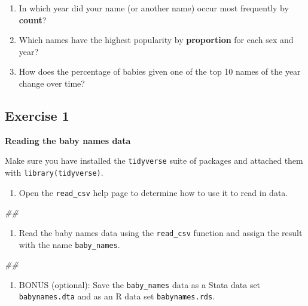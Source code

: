 \documentclass[]{book}
\newenvironment{Shaded}{\begin{snugshade}}{\end{snugshade}}
\newcommand{\CommentTok}[1]{\textcolor[rgb]{0.56,0.35,0.01}{\textit{#1}}}
\providecommand{\tightlist}{%
  \setlength{\itemsep}{0pt}\setlength{\parskip}{0pt}}
\begin{document}
\begin{enumerate}
\def\labelenumi{\arabic{enumi}.}
\tightlist
\item
  In which year did your name (or another name) occur most frequently by \textbf{count}?
\item
  Which names have the highest popularity by \textbf{proportion} for each sex and year?
\item
  How does the percentage of babies given one of the top 10 names of the year change over time?
\end{enumerate}

\hypertarget{exercise-1}{%
\subsection{Exercise 1}\label{exercise-1}}

\textbf{Reading the baby names data}

Make sure you have installed the \texttt{tidyverse} suite of packages and attached them with \texttt{library(tidyverse)}.

\begin{enumerate}
\def\labelenumi{\arabic{enumi}.}
\tightlist
\item
  Open the \texttt{read\_csv} help page to determine how to use it to read in data.
\end{enumerate}

\begin{Shaded}
\begin{Highlighting}[]
\CommentTok{##}
\end{Highlighting}
\end{Shaded}

\begin{enumerate}
\def\labelenumi{\arabic{enumi}.}
\setcounter{enumi}{1}
\tightlist
\item
  Read the baby names data using the \texttt{read\_csv} function and assign the result
  with the name \texttt{baby\_names}.
\end{enumerate}

\begin{Shaded}
\begin{Highlighting}[]
\CommentTok{##}
\end{Highlighting}
\end{Shaded}

\begin{enumerate}
\def\labelenumi{\arabic{enumi}.}
\setcounter{enumi}{2}
\tightlist
\item
  BONUS (optional): Save the \texttt{baby\_names} data as a Stata data set \texttt{babynames.dta}
  and as an R data set \texttt{babynames.rds}.
\end{enumerate}
\end{document}
